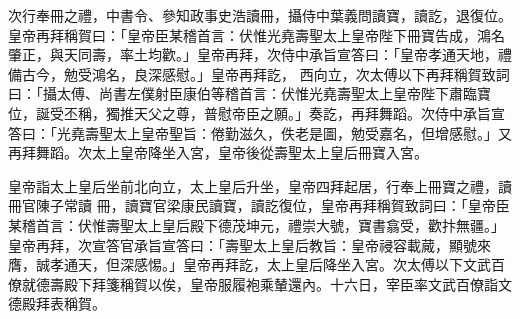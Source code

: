 \begin{pinyinscope}
 次行奉冊之禮，中書令、參知政事史浩讀冊，攝侍中葉義問讀寶，讀訖，退復位。皇帝再拜稱賀曰：「皇帝臣某稽首言：伏惟光堯壽聖太上皇帝陛下冊寶告成，鴻名肇正，與天同壽，率土均歡。」皇帝再拜，次侍中承旨宣答曰：「皇帝孝通天地，禮備古今，勉受鴻名，良深感慰。」皇帝再拜訖，
 西向立，次太傅以下再拜稱賀致詞曰：「攝太傅、尚書左僕射臣康伯等稽首言：伏惟光堯壽聖太上皇帝陛下肅臨寶位，誕受丕稱，獨推天父之尊，普慰帝臣之願。」奏訖，再拜舞蹈。次侍中承旨宣答曰：「光堯壽聖太上皇帝聖旨：倦勤滋久，佚老是圖，勉受嘉名，但增感慰。」又再拜舞蹈。次太上皇帝降坐入宮，皇帝後從壽聖太上皇后冊寶入宮。



 皇帝詣太上皇后坐前北向立，太上皇后升坐，皇帝四拜起居，行奉上冊寶之禮，讀冊官陳子常讀
 冊，讀寶官梁康民讀寶，讀訖復位，皇帝再拜稱賀致詞曰：「皇帝臣某稽首言：伏惟壽聖太上皇后殿下德茂坤元，禮崇大號，寶書翕受，歡抃無疆。」皇帝再拜，次宣答官承旨宣答曰：「壽聖太上皇后教旨：皇帝祲容載蕆，顯號來膺，誠孝通天，但深感惕。」皇帝再拜訖，太上皇后降坐入宮。次太傅以下文武百僚就德壽殿下拜箋稱賀以俟，皇帝服履袍乘輦還內。十六日，宰臣率文武百僚詣文德殿拜表稱賀。



\end{pinyinscope}